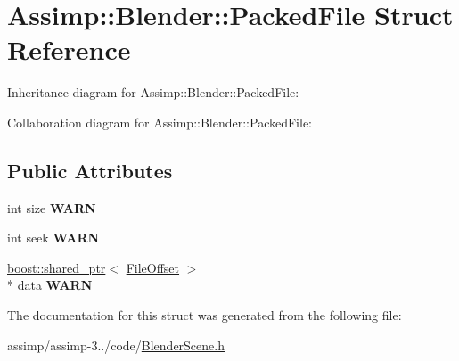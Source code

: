 \hypertarget{struct_assimp_1_1_blender_1_1_packed_file}{\section{Assimp\+:\+:Blender\+:\+:Packed\+File Struct Reference}
\label{struct_assimp_1_1_blender_1_1_packed_file}
}


Inheritance diagram for Assimp\+:\+:Blender\+:\+:Packed\+File\+:


Collaboration diagram for Assimp\+:\+:Blender\+:\+:Packed\+File\+:
\subsection*{Public Attributes}
\begin{DoxyCompactItemize}
\item 
\hypertarget{struct_assimp_1_1_blender_1_1_packed_file_a51d191f2d24af86b0e2bef65844fbb18}{int size {\bfseries W\+A\+R\+N}}\label{struct_assimp_1_1_blender_1_1_packed_file_a51d191f2d24af86b0e2bef65844fbb18}

\item 
\hypertarget{struct_assimp_1_1_blender_1_1_packed_file_a9dd16310e80d05755ba6923b7f4220dc}{int seek {\bfseries W\+A\+R\+N}}\label{struct_assimp_1_1_blender_1_1_packed_file_a9dd16310e80d05755ba6923b7f4220dc}

\item 
\hypertarget{struct_assimp_1_1_blender_1_1_packed_file_a091c6b9d11b8955cb276bd042d7802f1}{\hyperlink{classboost_1_1shared__ptr}{boost\+::shared\+\_\+ptr}$<$ \hyperlink{struct_assimp_1_1_blender_1_1_file_offset}{File\+Offset} $>$\\*
 data {\bfseries W\+A\+R\+N}}\label{struct_assimp_1_1_blender_1_1_packed_file_a091c6b9d11b8955cb276bd042d7802f1}

\end{DoxyCompactItemize}


The documentation for this struct was generated from the following file\+:\begin{DoxyCompactItemize}
\item 
assimp/assimp-\/3../code/\hyperlink{_blender_scene_8h}{Blender\+Scene.\+h}\end{DoxyCompactItemize}
